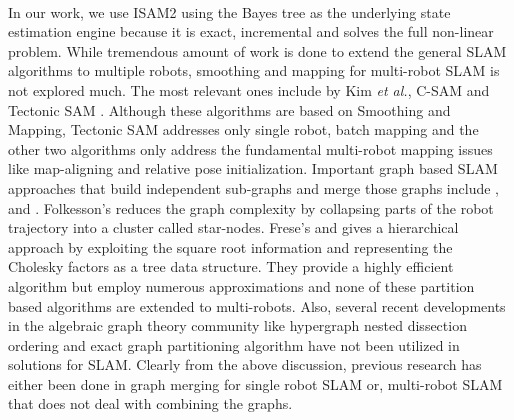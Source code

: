 \paragraph{}
In our work, we use ISAM2 using the Bayes tree \cite{kaessbayestree} \cite{kaessisam2} as the underlying state estimation engine because it is exact, incremental and solves the full non-linear problem. While tremendous amount of work is done to extend the general SLAM algorithms to multiple robots, smoothing and mapping for multi-robot SLAM is not explored much. The most relevant ones include \cite{multipleisam} by Kim \textit{et al.}, C-SAM \cite{csam} and Tectonic SAM \cite{tectonicsam}. Although these algorithms are based on Smoothing and Mapping, Tectonic SAM addresses only single robot, batch mapping and the other two algorithms only address the fundamental multi-robot mapping issues like map-aligning and relative pose initialization. Important graph based SLAM approaches that build independent sub-graphs and merge those graphs include \cite{gdescent}, \cite{fresetreemap} and \cite{freseclosing}.  Folkesson's \cite{gdescent} reduces the graph complexity by collapsing parts of the robot trajectory into a cluster called star-nodes. Frese's \cite{fresetreemap} and \cite{freseclosing} gives a hierarchical approach by exploiting the square root information and representing the Cholesky factors as a tree data structure. They provide a highly efficient algorithm but employ numerous approximations and none of these partition based algorithms are extended to multi-robots. Also, several recent developments in the algebraic graph theory community like hypergraph nested dissection ordering \cite{hund} and exact graph partitioning algorithm \cite{exactordering} have not been utilized in solutions for SLAM. Clearly from the above discussion, previous research has either been done in graph merging for single robot SLAM or, multi-robot SLAM that does not deal with combining the graphs. 
